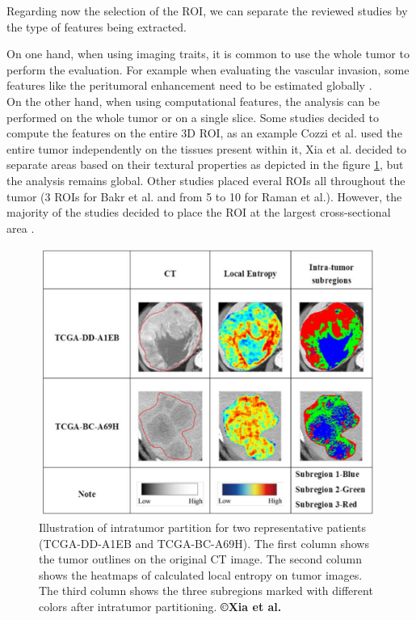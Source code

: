 \documentclass[]{article}
\begin{document}
Regarding now the selection of the ROI, we can separate the reviewed
studies by the type of features being extracted.

On one hand, when using imaging traits, it is common to use the whole
tumor to perform the evaluation. For example when evaluating the
vascular invasion, some features like the peritumoral enhancement need
to be estimated globally \cite{Renzulli2016,Banerjee2015,Segal2007,Kuo2007}.\\
On the other hand, when using computational features, the analysis can
be performed on the whole tumor or on a single slice. Some studies
decided to compute the features on the entire 3D ROI, as an example Cozzi et al. used the entire tumor independently on
the tissues present within it, Xia et al. decided to separate
areas based on their textural properties as depicted in the figure \ref{XiaFig_subregions}, but the
analysis remains global. Other studies placed everal ROIs all throughout
the tumor (3 ROIs for Bakr et al. and from 5 to 10 for
Raman et al.). However, the majority of the studies decided to
place the ROI at the largest cross-sectional area \cite{Li2016,Chen2017,Zhou2017a,Akai2018,Zheng2018}.

\begin{figure}[ht!]
\centering
\includegraphics[width=4.34043in,height=3.46021in]{./images/image16.png}
\caption{Illustration of intratumor partition for two representative
patients (TCGA-DD-A1EB and TCGA-BC-A69H). The first column shows the
tumor outlines on the original CT image. The second column shows the
heatmaps of calculated local entropy on tumor images. The third column
shows the three subregions marked with different colors after intratumor
partitioning. \textbf{©Xia et al.} }
\label{XiaFig_subregions}
\end{figure}
\end{document}
